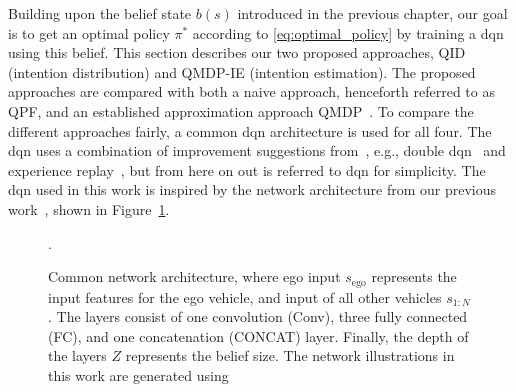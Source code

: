 
Building upon the belief state $b(s)$ introduced in the previous chapter, our goal is to get an optimal policy $\pi^*$ according to \eqref{eq:optimal_policy} by training a \gls{dqn} using this belief. This section describes our two proposed approaches, QID (intention distribution) and QMDP-IE (intention estimation). 
The proposed approaches are compared with both a naive approach, henceforth referred to as QPF, and an established approximation approach QMDP~\cite{Littman1995}. 
To compare the different approaches fairly, a common \gls{dqn} architecture is used for all four. 
The \gls{dqn} uses a combination of improvement suggestions from~\cite{rainbow}, e.g., double \gls{dqn}~\cite{Hasselt2016ddqn} and experience replay~\cite{Lin1992}, but from here on out is referred to \gls{dqn} for simplicity. The \gls{dqn} used in this work is inspired by the network architecture from our previous work~\cite{tram2019}, shown in Figure~\ref{fig:network}. 
\begin{figure}[!h]
    \centering
    
    \caption{Common network architecture, where ego input $s_\mathrm{ego}$ represents the input features for the ego vehicle, and input of all other vehicles $s_{1:N}$. The layers consist of one convolution (Conv), three fully connected (FC), and one concatenation (CONCAT) layer. Finally, the depth of the layers $Z$ represents the belief size. The network illustrations in this work are generated using \cite{PlotNeuralNet}}.
    \label{fig:network}
\end{figure}

